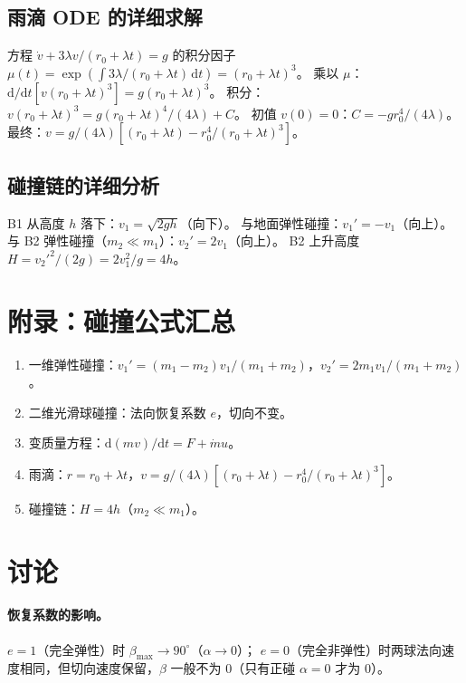 \documentclass[UTF8,a4paper,11pt]{ctexart}
\begin{document}
\subsection{雨滴 ODE 的详细求解}
\label{sub:raindrop-detail}

方程 $\dot v+3\lambda v/(r_0+\lambda t)=g$ 的积分因子
$\mu(t)=\exp(\int 3\lambda/(r_0+\lambda t)\,\mathrm dt)=(r_0+\lambda t)^3$。
乘以 $\mu$：$\mathrm d/\mathrm dt[v(r_0+\lambda t)^3]=g(r_0+\lambda t)^3$。
积分：$v(r_0+\lambda t)^3 = g(r_0+\lambda t)^4/(4\lambda)+C$。
初值 $v(0)=0$：$C=-g r_0^4/(4\lambda)$。
最终：$v=g/(4\lambda)[(r_0+\lambda t)-r_0^4/(r_0+\lambda t)^3]$。

\subsection{碰撞链的详细分析}
\label{sub:chain-detail}

B1 从高度 $h$ 落下：$v_1=\sqrt{2gh}$（向下）。
与地面弹性碰撞：$v_1'=-v_1$（向上）。
与 B2 弹性碰撞（$m_2\ll m_1$）：$v_2'=2v_1$（向上）。
B2 上升高度 $H=v_2'^2/(2g)=2v_1^2/g=4h$。

\section{附录：碰撞公式汇总}
\label{sec:appendix}

\begin{enumerate}
  \item 一维弹性碰撞：$v_1'=(m_1-m_2)v_1/(m_1+m_2)$，$v_2'=2m_1 v_1/(m_1+m_2)$。
  \item 二维光滑球碰撞：法向恢复系数 $e$，切向不变。
  \item 变质量方程：$\mathrm d(mv)/\mathrm dt=F+\dot m u$。
  \item 雨滴：$r=r_0+\lambda t$，$v=g/(4\lambda)[(r_0+\lambda t)-r_0^4/(r_0+\lambda t)^3]$。
  \item 碰撞链：$H=4h$（$m_2\ll m_1$）。
\end{enumerate}

\section{讨论}
\label{sec:discuss}

\paragraph{恢复系数的影响。}
$e=1$（完全弹性）时 $\beta_{\max}\to 90^\circ$（$\alpha\to0$）；
$e=0$（完全非弹性）时两球法向速度相同，但切向速度保留，$\beta$ 一般不为 $0$（只有正碰 $\alpha=0$ 才为 $0$）。
\end{document}
